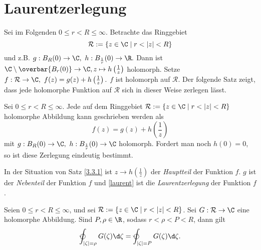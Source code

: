 \section{Laurentzerlegung}\lecture
		
		Sei im Folgenden $ 0 \leq r < R \leq \infty $. Betrachte das Ringgebiet $$ \mathcal{R} := \{z \in \C \mid r < |z| < R\} $$
		und z.B. $ g: B_R(0) \to \C,\ h: B_{\frac{1}{r}}(0) \to \R. $ Dann ist $ \C \setminus \overbar{B_r(0)} \to \C, z \mapsto h\left(\frac{1}{z}\right) $ holomorph. Setze $ f: \mathcal{R} \to \C,\ f(z) = g(z) + h\left(\frac{1}{z}\right). $ $f$ ist holomorph auf $\mathcal{R}$. Der folgende Satz zeigt, dass jede holomorphe Funktion auf $ \mathcal{R} $ sich in dieser Weise zerlegen lässt.
		
		\begin{thmn}[Laurentzerlegung]\label{3.3.1}
			Sei $ 0 \leq r < R \leq \infty $. Jede auf dem Ringgebiet $ \mathcal{R} := \{z \in \C \mid r < |z| < R\} $ holomorphe Abbildung kann geschrieben werden als
			\begin{equation}\label{laurent}
			f(z) = g(z) + h\left(\frac{1}{z}\right)
			\end{equation}
			mit $ g: B_R(0) \to \C,\ h: B_{\frac{1}{r}}(0) \to \C $ holomorph. Fordert man noch $h(0) = 0$, so ist diese Zerlegung eindeutig bestimmt.
		\end{thmn}
		
		\begin{defn}
			In der Situation von Satz \ref{3.3.1} ist $ z \to h\left(\frac{1}{z}\right) $ der \emph{Hauptteil} der Funktion $f$. $g$ ist der \emph{Nebenteil} der Funktion $f$ und \ref{laurent} ist die \emph{Laurentzerlegung} der Funktion $f$.
		\end{defn}
		
		\begin{lem}
			Seien $ 0 \leq r < R \leq \infty $, und sei $ \mathcal{R} := \{z \in \C \mid r < |z| < R\} $. Sei $ G: \mathcal{R} \to \C $ eine holomorphe Abbildung. Sind $ P, \rho \in \R $, sodass $ r < \rho < P < R $, dann gilt 
			\[ \varointctrclockwise_{|\zeta| = \rho} G(\zeta) \d\zeta = \varointctrclockwise_{|\zeta| = P} G(\zeta)\d\zeta. \]
		\end{lem}
		

